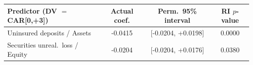 \begin{tabular}{lccc}
\toprule
Predictor (DV $=$ CAR[0,+3]) & Actual coef. & Perm.\ 95\% interval & RI $p$-value \\
\midrule
Uninsured deposits / Assets & -0.0415 & [-0.0204, +0.0198] & 0.0000 \\
Securities unreal.\ loss / Equity & -0.0204 & [-0.0204, +0.0176] & 0.0380 \\
\bottomrule
\end{tabular}
